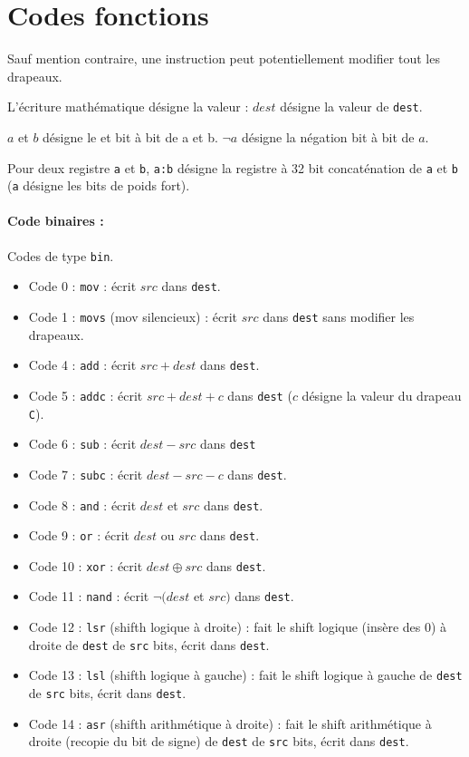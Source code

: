 \documentclass[12pt]{article}
\begin{document}
\section{Codes fonctions}

Sauf mention contraire, une instruction peut potentiellement modifier tout les
drapeaux.

L'écriture mathématique désigne la valeur : $dest$ désigne la valeur de \verb!dest!.

$a$ et $b$ désigne le \og et \fg{} bit à bit de a et b. $\neg a$ désigne la
négation bit à bit de $a$.

Pour deux registre \verb!a! et \verb!b!, \verb!a:b! désigne la registre à 32 bit
concaténation de \verb!a! et \verb!b! (\verb!a! désigne les bits de poids fort).


\paragraph{Code binaires :} Codes de type \verb!bin!.
\begin{itemize}
\item Code 0 : \verb!mov! : écrit $src$ dans \verb!dest!.
\item Code 1 : \verb!movs! (mov silencieux) : écrit $src$ dans \verb!dest!
  sans modifier les drapeaux.
\item Code 4 : \verb!add! : écrit $src + dest$ dans \verb!dest!.
\item Code 5 : \verb!addc! : écrit $src + dest + c$ dans \verb!dest! ($c$
  désigne la valeur du drapeau \verb!C!).
\item Code 6 : \verb!sub! : écrit $dest - src$ dans \verb!dest!
\item Code 7 : \verb!subc! : écrit $dest - src -c $ dans \verb!dest!.
\item Code 8 : \verb!and! : écrit $dest$ et $src$ dans \verb!dest!.
\item Code 9 : \verb!or! : écrit $dest$ ou $src$ dans \verb!dest!.
\item Code 10 : \verb!xor! : écrit $dest \oplus src$ dans \verb!dest!.
\item Code 11 : \verb!nand! : écrit $\neg(dest$ et $src)$ dans \verb!dest!.
\item Code 12 : \verb!lsr! (shifth logique à droite) : fait le shift logique
  (insère des 0) à droite de \verb!dest! de \verb!src! bits, écrit dans \verb!dest!.
\item Code 13 : \verb!lsl! (shifth logique à gauche) : fait le shift logique à
  gauche de \verb!dest! de \verb!src! bits, écrit dans \verb!dest!.
\item Code 14 : \verb!asr! (shifth arithmétique à droite) : fait le shift arithmétique à
  droite (recopie du bit de signe) de \verb!dest! de \verb!src! bits, écrit dans \verb!dest!.
\end{itemize}
\end{document}
